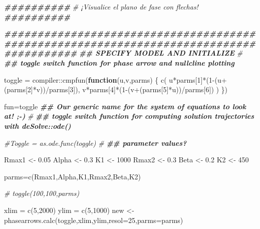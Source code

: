 \documentclass[
]{article}
\newenvironment{Shaded}{\begin{snugshade}}{\end{snugshade}}
\newcommand{\AttributeTok}[1]{\textcolor[rgb]{0.77,0.63,0.00}{#1}}
\newcommand{\CommentTok}[1]{\textcolor[rgb]{0.56,0.35,0.01}{\textit{#1}}}
\newcommand{\ControlFlowTok}[1]{\textcolor[rgb]{0.13,0.29,0.53}{\textbf{#1}}}
\newcommand{\DecValTok}[1]{\textcolor[rgb]{0.00,0.00,0.81}{#1}}
\newcommand{\DocumentationTok}[1]{\textcolor[rgb]{0.56,0.35,0.01}{\textbf{\textit{#1}}}}
\newcommand{\FloatTok}[1]{\textcolor[rgb]{0.00,0.00,0.81}{#1}}
\newcommand{\FunctionTok}[1]{\textcolor[rgb]{0.00,0.00,0.00}{#1}}
\newcommand{\NormalTok}[1]{#1}
\newcommand{\OtherTok}[1]{\textcolor[rgb]{0.56,0.35,0.01}{#1}}
\newcommand{\SpecialCharTok}[1]{\textcolor[rgb]{0.00,0.00,0.00}{#1}}
\begin{document}
\begin{Shaded}
\begin{Highlighting}[]
\DocumentationTok{\#\#\#\#\#\#\#\#\#\#}
\CommentTok{\# ¡Visualice el plano de fase con flechas!}
\DocumentationTok{\#\#\#\#\#\#\#\#\#\#}

\DocumentationTok{\#\#\#\#\#\#\#\#\#\#\#\#\#\#\#\#\#\#\#\#\#\#\#\#\#\#\#\#\#\#\#\#\#\#\#\#\#\#\#\#\#\#\#\#\#\#\#\#\#\#\#\#\#\#\#\#\#\#\#\#\#\#\#\#\#\#\#\#\#\#\#\#\#\#\#\#\#\#\#\#\#\#\#\#\#\#\#}
\DocumentationTok{\#\# SPECIFY MODEL AND INITIALIZE}
\CommentTok{\#}
\DocumentationTok{\#\# toggle switch function for phase arrow and nullcline plotting }

\NormalTok{toggle }\OtherTok{=}\NormalTok{ compiler}\SpecialCharTok{::}\FunctionTok{cmpfun}\NormalTok{(}\ControlFlowTok{function}\NormalTok{(u,v,parms) \{}
  \FunctionTok{c}\NormalTok{( u}\SpecialCharTok{*}\NormalTok{parms[}\DecValTok{1}\NormalTok{]}\SpecialCharTok{*}\NormalTok{(}\DecValTok{1}\SpecialCharTok{{-}}\NormalTok{(u}\SpecialCharTok{+}\NormalTok{(parms[}\DecValTok{2}\NormalTok{]}\SpecialCharTok{*}\NormalTok{v))}\SpecialCharTok{/}\NormalTok{parms[}\DecValTok{3}\NormalTok{]), v}\SpecialCharTok{*}\NormalTok{parms[}\DecValTok{4}\NormalTok{]}\SpecialCharTok{*}\NormalTok{(}\DecValTok{1}\SpecialCharTok{{-}}\NormalTok{(v}\SpecialCharTok{+}\NormalTok{(parms[}\DecValTok{5}\NormalTok{]}\SpecialCharTok{*}\NormalTok{u))}\SpecialCharTok{/}\NormalTok{parms[}\DecValTok{6}\NormalTok{]) )}
\NormalTok{\})}

\NormalTok{fun}\OtherTok{=}\NormalTok{toggle }\DocumentationTok{\#\# Our generic name for the system of equations to look at! ;{-})}
\CommentTok{\#}
\DocumentationTok{\#\# toggle switch function for computing solution trajectories with deSolve::ode()}

\CommentTok{\#Toggle = as.ode.func(toggle)}
\CommentTok{\#}
\DocumentationTok{\#\# parameter values?}

\NormalTok{Rmax1 }\OtherTok{\textless{}{-}} \FloatTok{0.05}
\NormalTok{Alpha }\OtherTok{\textless{}{-}} \FloatTok{0.3}
\NormalTok{K1 }\OtherTok{\textless{}{-}} \DecValTok{1000}
\NormalTok{Rmax2 }\OtherTok{\textless{}{-}} \FloatTok{0.3}
\NormalTok{Beta }\OtherTok{\textless{}{-}} \FloatTok{0.2}
\NormalTok{K2 }\OtherTok{\textless{}{-}} \DecValTok{450}

\NormalTok{parms}\OtherTok{=}\FunctionTok{c}\NormalTok{(Rmax1,Alpha,K1,Rmax2,Beta,K2)}

\CommentTok{\# toggle(100,100,parms)}

\NormalTok{xlim }\OtherTok{=} \FunctionTok{c}\NormalTok{(}\DecValTok{5}\NormalTok{,}\DecValTok{2000}\NormalTok{)}
\NormalTok{ylim }\OtherTok{=} \FunctionTok{c}\NormalTok{(}\DecValTok{5}\NormalTok{,}\DecValTok{1000}\NormalTok{)}
\NormalTok{new }\OtherTok{\textless{}{-}} \FunctionTok{phasearrows.calc}\NormalTok{(toggle,xlim,ylim,}\AttributeTok{resol=}\DecValTok{25}\NormalTok{,}\AttributeTok{parms=}\NormalTok{parms)}


\end{Highlighting}
\end{Shaded}
\end{document}
